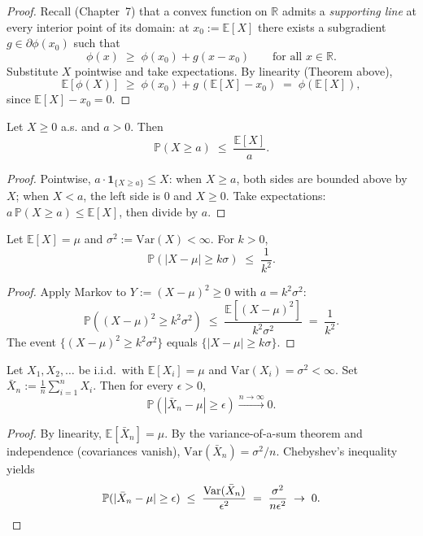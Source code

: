 \begin{proof}
Recall (Chapter~7) that a convex function on $\mathbb{R}$ admits a \emph{supporting line} at every interior point of its domain: at $x_0 := \mathbb{E}[X]$ there exists a subgradient $g \in \partial\phi(x_0)$ such that
\[
\phi(x) \;\ge\; \phi(x_0) + g(x - x_0) \qquad \text{for all } x \in \mathbb{R}.
\]
Substitute $X$ pointwise and take expectations. By linearity (Theorem above),
\[
\mathbb{E}[\phi(X)] \;\ge\; \phi(x_0) + g\,(\mathbb{E}[X] - x_0) \;=\; \phi(\mathbb{E}[X]),
\]
since $\mathbb{E}[X] - x_0 = 0$.
\end{proof}

\begin{theorem}
Let $X \ge 0$ a.s. and $a > 0$. Then
\[
\mathbb{P}(X \ge a) \;\le\; \frac{\mathbb{E}[X]}{a}.
\]
\end{theorem}

\begin{proof}
Pointwise, $a\cdot \mathbf{1}_{\{X\ge a\}} \le X$: when $X \ge a$, both sides are bounded above by $X$; when $X < a$, the left side is $0$ and $X \ge 0$. Take expectations: $a\,\mathbb{P}(X\ge a) \le \mathbb{E}[X]$, then divide by $a$.
\end{proof}

\begin{theorem}
Let $\mathbb{E}[X] = \mu$ and $\sigma^2 := \mathrm{Var}(X) < \infty$. For $k > 0$,
\[
\mathbb{P}(|X - \mu| \ge k\sigma) \;\le\; \frac{1}{k^2}.
\]
\end{theorem}

\begin{proof}
Apply Markov to $Y := (X - \mu)^2 \ge 0$ with $a = k^2\sigma^2$:
\[
\mathbb{P}((X-\mu)^2 \ge k^2\sigma^2) \;\le\; \frac{\mathbb{E}[(X-\mu)^2]}{k^2\sigma^2} \;=\; \frac{1}{k^2}.
\]
The event $\{(X-\mu)^2 \ge k^2\sigma^2\}$ equals $\{|X-\mu| \ge k\sigma\}$.
\end{proof}

\begin{theorem}
Let $X_1, X_2, \dots$ be i.i.d.\ with $\mathbb{E}[X_i] = \mu$ and $\mathrm{Var}(X_i) = \sigma^2 < \infty$. Set $\bar{X}_n := \frac{1}{n}\sum_{i=1}^n X_i$. Then for every $\epsilon > 0$,
\[
\mathbb{P}(|\bar{X}_n - \mu| \ge \epsilon) \xrightarrow{n\to\infty} 0.
\]
\end{theorem}

\begin{proof}
By linearity, $\mathbb{E}[\bar{X}_n] = \mu$. By the variance-of-a-sum theorem and independence (covariances vanish), $\mathrm{Var}(\bar{X}_n) = \sigma^2/n$. Chebyshev's inequality yields
\[
\mathbb{P}(|\bar{X}_n - \mu| \ge \epsilon) \;\le\; \frac{\mathrm{Var}(\bar{X}_n)}{\epsilon^2} \;=\; \frac{\sigma^2}{n\epsilon^2} \;\to\; 0. \qedhere
\]
\end{proof}

